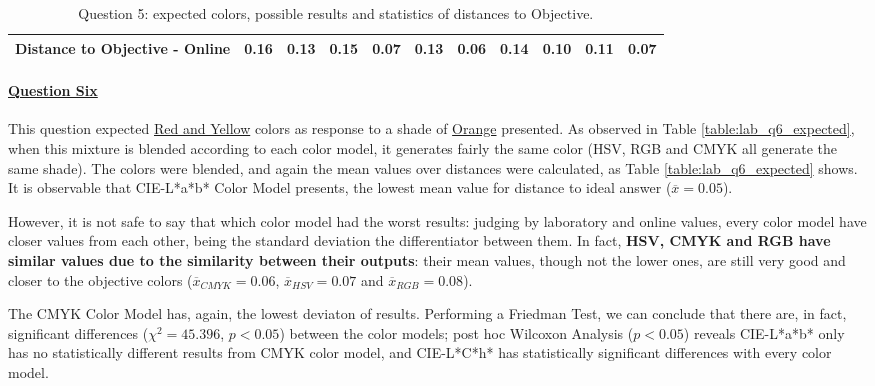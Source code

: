 \begin{table}[H]
{\begin{tabular}{lccccccccccccc}
    \multicolumn{4}{l}{Distance to Objective - Online}                                                                                               & \multicolumn{1}{|c}{0.16}        & \multicolumn{1}{c|}{0.13}    & \multicolumn{1}{|c}{0.15}        & \multicolumn{1}{c|}{0.07}    & \multicolumn{1}{|c}{\textbf{0.13}}       & \multicolumn{1}{c|}{0.06}    & \multicolumn{1}{|c}{0.14}        & \multicolumn{1}{c|}{0.10}    & \multicolumn{1}{|c}{0.11}       & \multicolumn{1}{c|}{0.07}    \\ \hline
    \end{tabular}}
  \caption[Question 5, with expected Results.]{Question 5: expected colors, possible results and statistics of distances to Objective.}
  \label{table:lab_q5_expected}
\end{table}
%
\paragraph{\ul{Question Six}}
%
This question expected \ul{Red and Yellow} colors as response to a shade of \ul{Orange} presented. As observed in Table \ref{table:lab_q6_expected}, when this mixture is blended according
to each color model, it generates fairly the same color (HSV, RGB and CMYK all generate the same shade). The colors were blended, and again the mean values over distances were calculated, as Table \ref{table:lab_q6_expected} shows. It is observable that CIE-L*a*b* Color Model presents,
the lowest mean value for distance to ideal answer ($\overline{x} = 0.05$). \par
%
However, it is not safe to say that which color model had the worst results: judging by laboratory and online values, every color model have closer values from each other, being the
standard deviation the differentiator between them. In fact, \textbf{HSV, CMYK and RGB have similar values due to the similarity between their outputs}: their mean values, though not
the lower ones, are still very good and closer to the objective colors ($\overline{x}_{CMYK} = 0.06$, $\overline{x}_{HSV} = 0.07$ and $\overline{x}_{RGB} = 0.08$). \par
%
The CMYK Color Model has, again, the lowest deviaton of results. Performing a Friedman Test, we can conclude that there are, in fact, significant differences ($\chi^2 = 45.396$, $p < 0.05$)
between the color models; post hoc Wilcoxon Analysis ($p < 0.05$) reveals CIE-L*a*b* only has no statistically different results from CMYK color model, and CIE-L*C*h* has statistically
significant differences with every color model.
